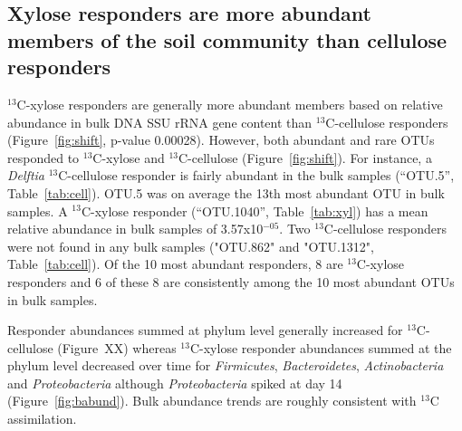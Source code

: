 \subsection{Xylose responders are more abundant members of the soil community
than cellulose responders}
$^{13}$C-xylose responders are generally more abundant members based on
relative abundance in bulk DNA SSU rRNA gene content than $^{13}$C-cellulose
responders (Figure~\ref{fig:shift}, p-value 0.00028).  However, both abundant
and rare OTUs responded to $^{13}$C-xylose and $^{13}$C-cellulose
(Figure~\ref{fig:shift}). For instance, a \textit{Delftia} $^{13}$C-cellulose
responder is fairly abundant in the bulk samples (``OTU.5'',
Table~\ref{tab:cell}). OTU.5 was on average the 13th most abundant OTU in bulk
samples. A $^{13}$C-xylose responder (``OTU.1040'', Table~\ref{tab:xyl}) has a
mean relative abundance in bulk samples of 3.57x10$^{-05}$. Two
$^{13}$C-cellulose responders were not found in any bulk samples ("OTU.862" and
"OTU.1312", Table~\ref{tab:cell}). Of the 10 most abundant responders, 8 are
$^{13}$C-xylose responders and 6 of these 8 are consistently among the 10 most
abundant OTUs in bulk samples.

Responder abundances summed at phylum level generally increased for
$^{13}$C-cellulose (Figure~XX) whereas $^{13}$C-xylose responder abundances
summed at the phylum level decreased over time for \textit{Firmicutes},
\textit{Bacteroidetes}, \textit{Actinobacteria} and \textit{Proteobacteria}
although \textit{Proteobacteria} spiked at day 14 (Figure~\ref{fig:babund}).
Bulk abundance trends are roughly consistent with $^{13}$C assimilation.

